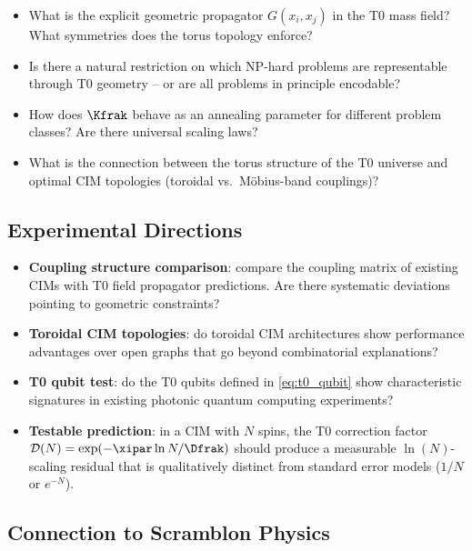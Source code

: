 \begin{itemize}
    \item What is the explicit geometric propagator $G(x_i, x_j)$ in the T0 mass field?
    What symmetries does the torus topology enforce?

    \item Is there a natural restriction on which NP-hard problems are representable
    through T0 geometry -- or are all problems in principle encodable?

    \item How does $\Kfrak$ behave as an annealing parameter for different problem
    classes? Are there universal scaling laws?

    \item What is the connection between the torus structure of the T0 universe and
    optimal CIM topologies (toroidal vs.\ Möbius-band couplings)?
\end{itemize}

\subsection{Experimental Directions}

\begin{itemize}
    \item \textbf{Coupling structure comparison}: compare the coupling matrix of
    existing CIMs with T0 field propagator predictions. Are there systematic
    deviations pointing to geometric constraints?

    \item \textbf{Toroidal CIM topologies}: do toroidal CIM architectures show
    performance advantages over open graphs that go beyond combinatorial explanations?

    \item \textbf{T0 qubit test}: do the T0 qubits defined in \eqref{eq:t0_qubit}
    show characteristic signatures in existing photonic quantum computing experiments?

    \item \textbf{Testable prediction}: in a CIM with $N$ spins, the T0 correction
    factor $\mathcal{D}(N) = \exp(-\xipar \ln N / \Dfrak)$ should produce a measurable
    $\ln(N)$-scaling residual that is qualitatively distinct from standard error models
    ($1/N$ or $e^{-N}$).
\end{itemize}

\subsection{Connection to Scramblon Physics}

